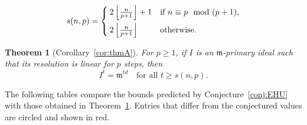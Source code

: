 \documentclass[11pt,letterpaper,reqno]{amsart}
\newcommand{\m}{\mathfrak{m}}
\newtheorem{thmx}{Theorem}
\theoremstyle{definition}
\numberwithin{equation}{section}
\begin{document}
\[s(n,p) = \begin{cases}
        2 \left\lfloor \frac{n}{p+1} \right\rfloor + 1 &\text{if }n \equiv p \mod (p+1),\vspace{0.05in}\\
        2 \left\lfloor \frac{n}{p+1} \right\rfloor &\text{otherwise}.
    \end{cases}\]
\begin{thmx}[Corollary~\ref{cor:thmA}]\label{mainthm:B}
    For $p \ge 1$, if $I$ is an $\m$-primary ideal such that its resolution is linear for $p$ steps, then
    \[I^t = \m^{td} \quad \text{for all }t \ge s(n,p).\]
\end{thmx}
\noindent The following tables compare the bounds predicted by Conjecture~\ref{conj:EHU} with those obtained in Theorem~\ref{mainthm:B}. Entries that differ from the conjectured values are circled and shown in red.
\end{document}
